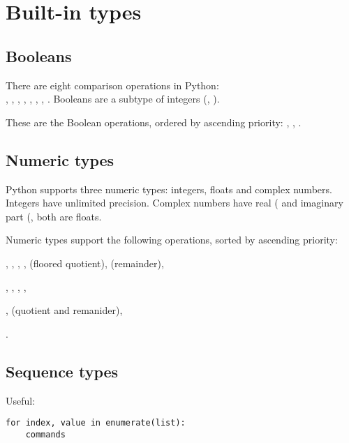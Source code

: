 \section{Built-in types}
\subsection{Booleans}
There are eight comparison operations in Python: \\
\python{<}, \python{<=}, \python{>}, \python{>=}, 
\python{==}, \python{!=}, , .
Booleans are a subtype of integers (, ).

These are the Boolean operations, ordered by ascending priority: ,
, .

\subsection{Numeric types}
Python supports three numeric types: integers, floats and complex numbers.
Integers have unlimited precision.
Complex numbers have real ( and imaginary part (,
both are floats.

Numeric types support the following operations, sorted by ascending priority:
\begin{itemx}
\item \python{+}, \python{-}, \python{*}, \python{/}, \python{//} (floored quotient), \python{\%} (remainder),
\item {}, , , ,
\item {},  (quotient and remanider),
\item {}.
\end{itemx}


\subsection{Sequence types}
Useful:
\begin{verbatim}
for index, value in enumerate(list):
    commands
\end{verbatim}

